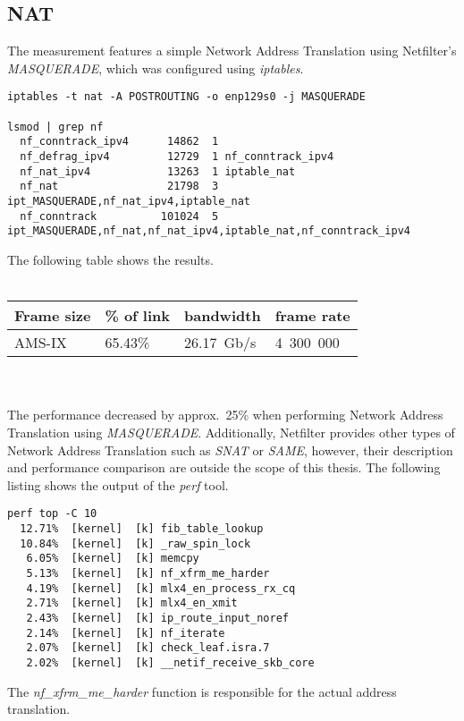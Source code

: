 
\subsection{NAT}
The measurement features a simple Network Address Translation using Netfilter's {\it{MASQUERADE}},
which was configured using {\it{iptables}}.
\begin{lstlisting}
iptables -t nat -A POSTROUTING -o enp129s0 -j MASQUERADE

lsmod | grep nf
  nf_conntrack_ipv4      14862  1 
  nf_defrag_ipv4         12729  1 nf_conntrack_ipv4
  nf_nat_ipv4            13263  1 iptable_nat
  nf_nat                 21798  3 ipt_MASQUERADE,nf_nat_ipv4,iptable_nat
  nf_conntrack          101024  5 ipt_MASQUERADE,nf_nat,nf_nat_ipv4,iptable_nat,nf_conntrack_ipv4
\end{lstlisting}
The following table shows the results.
\\
\\
\begin{tabular}{ | l | l | l | l | }
\hline
Frame size & \% of link & bandwidth & frame rate \\
\hline
AMS-IX & 65.43\% & 26.17~Gb/s & 4~300~000 \\
\hline
\end{tabular}
\\
\\
The performance decreased by approx.~25\% when performing Network Address Translation using {\it{MASQUERADE}}.
Additionally, Netfilter provides other types of Network Address Translation such as {\it{SNAT}} or {\it{SAME}},
however, their description and performance comparison are outside the scope of this thesis.
The following listing shows the output of the {\it{perf}} tool.
\begin{lstlisting}
perf top -C 10
  12.71%  [kernel]  [k] fib_table_lookup
  10.84%  [kernel]  [k] _raw_spin_lock
   6.05%  [kernel]  [k] memcpy
   5.13%  [kernel]  [k] nf_xfrm_me_harder
   4.19%  [kernel]  [k] mlx4_en_process_rx_cq
   2.71%  [kernel]  [k] mlx4_en_xmit
   2.43%  [kernel]  [k] ip_route_input_noref
   2.14%  [kernel]  [k] nf_iterate
   2.07%  [kernel]  [k] check_leaf.isra.7
   2.02%  [kernel]  [k] __netif_receive_skb_core
\end{lstlisting}
The {\it{nf\_xfrm\_me\_harder}} function is responsible for the actual address translation.
